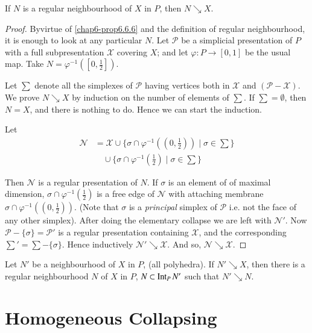 \begin{proposition}\label{chap6-prop6.6.8}
If $N$ is a regular neighbourhood of $X$ in $P$, then $N\searrow X$.
\end{proposition}

\begin{proof}
By\pageoriginale virtue of \ref{chap6-prop6.6.6} and the definition of regular neighbourhood, it is enough to look at any particular $N$. Let $\mathscr{P}$ be a simplicial presentation of $P$ with a full subpresentation $\mathscr{X}$ covering $X$; and let $\varphi:P\to [0,1]$ be the usual map. Take $N=\varphi^{-1}([0,\frac{1}{2}])$.

Let $\sum$ denote all the simplexes of $\mathscr{P}$ having vertices both in $\mathscr{X}$ and $(\mathscr{P}-\mathscr{X})$. We prove $N\searrow X$ by induction on the number of elements of $\sum$. If $\sum=\emptyset$, then $N=X$, and there is nothing to do. Hence we can start the induction.

Let
\begin{align*}
\mathscr{N} &= \mathscr{X}\cup \{\sigma\cap \varphi^{-1}((0,\frac{1}{2}))\mid \sigma\in \sum\}\\
&\quad \cup \{\sigma\cap \varphi^{-1}(\frac{1}{2})\mid \sigma\in\sum\}
\end{align*}

Then $\mathscr{N}$ is a regular presentation of $N$. If $\sigma$ is an element of of maximal dimension, $\sigma\cap \varphi^{-1}(\frac{1}{2})$ is a free edge of $\mathscr{N}$ with attaching membrane $\sigma\cap \varphi^{-1}((0,\frac{1}{2}))$. (Note that $\sigma$ is a {\em principal} simplex of $\mathscr{P}$ i.e. not the face of any other simplex). After doing the elementary collapse we are left with $\mathscr{N}'$. Now $\mathscr{P}-\{\sigma\}=\mathscr{P}'$ is a regular presentation containing $\mathscr{X}$, and the corresponding $\sum'=\sum-\{\sigma\}$. Hence inductively $\mathscr{N}'\searrow \mathscr{X}$. And so, $\mathscr{N}\searrow \mathscr{X}$.
\end{proof}

\begin{ex}\label{chap6-ex6.6.9}
Let $N'$ be a neighbourhood of $X$ in $P$, (all polyhedra). If $N'\searrow X$, then there is a regular neighbourhood $N$ of $X$ in $P$, $N\subset \operatorname{Int}_{P}N'$ such that $N'\searrow N$.
\end{ex}

\section{Homogeneous Collapsing}\label{chap6-sec6.7}

